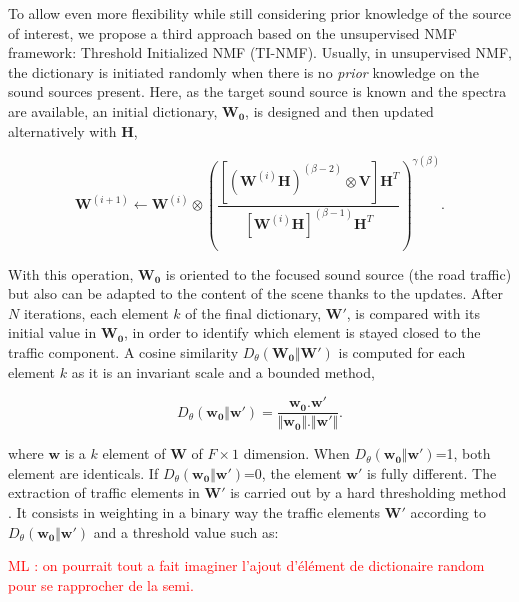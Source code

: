 \documentclass[review,5p,twocolumn,sort&compress,times]{elsarticle}
\newcommand{\ml}[1]{\textcolor{red}{ML : #1}}
\begin{document}
To allow even more flexibility while still considering prior knowledge of the source of interest, we propose a third approach based on the unsupervised NMF framework: Threshold Initialized NMF (TI-NMF). Usually, in unsupervised NMF, the dictionary is initiated randomly when there is no \textit{prior} knowledge on the sound sources present. Here, as the target sound source is known and the spectra are available, an initial dictionary, $\mathbf{W_0}$, is designed and then updated alternatively with $\mathbf{H}$,

\begin{equation}\label{eq:updateW_unsup}
\textbf{W}^{(i+1)} \leftarrow \mathbf{W}^{(i)}\otimes \left(\frac{\left[\left(\mathbf{W}^{(i)}\mathbf{H} \right)^{(\beta-2)}\otimes \mathbf{V} \right]\mathbf{H}^T}{\left[\mathbf{W}^{(i)}\mathbf{H} \right]^{(\beta-1)}\mathbf{H}^T}\right)^{\gamma(\beta)}.
\end{equation}

With this operation, $\mathbf{W_0}$ is oriented to the focused sound source (the road traffic) but also can be adapted to the content of the scene thanks to the updates. After $N$ iterations, each element $k$ of the final dictionary, $\mathbf{W'}$, is compared with its initial value in $\mathbf{W_0}$, in order to identify which element is stayed closed to the traffic component. A cosine similarity $D_{\theta}\left(\mathbf{W_0} \Vert \mathbf{W'} \right)$ is computed for each element $k$ as it is an invariant scale and a bounded method,

\begin{equation}
D_{\theta}\left(\mathbf{w_0} \Vert \mathbf{w'} \right) = \frac{\mathbf{w_0}.\mathbf{w'}}{\Vert \mathbf{w_0}  \Vert . \Vert \mathbf{w'} \Vert}.
\end{equation}

where $\mathbf{w}$ is a $k$ element of $\mathbf{W}$ of $F \times 1$ dimension. When $D_{\theta}\left(\mathbf{w_0} \Vert \mathbf{w'} \right)$=1, both element are identicals. If $D_{\theta}\left(\mathbf{w_0} \Vert \mathbf{w'} \right)$=0, the element $\mathbf{w'}$ is fully different. The extraction of traffic elements in $\mathbf{W'}$ is carried out by a hard thresholding method \cite{donoho1994threshold}. It consists in weighting in a binary way the traffic elements $\mathbf{W'}$ according to $D_{\theta}\left(\mathbf{w_0} \Vert \mathbf{w'} \right)$ and a threshold value such as:

\ml{on pourrait tout a fait imaginer l'ajout d'élément de dictionaire random pour se rapprocher de la semi.}
\end{document}
